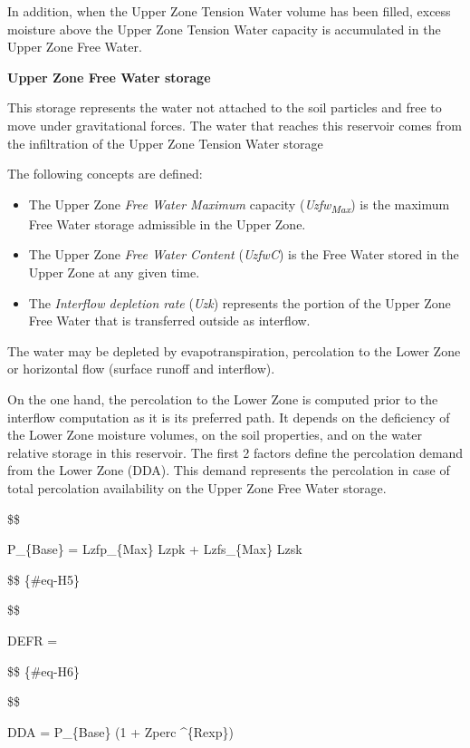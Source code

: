 \documentclass[
  letterpaper,
  DIV=11,
  numbers=noendperiod]{scrreprt}
\begin{document}
In addition, when the Upper Zone Tension Water volume has been filled,
excess moisture above the Upper Zone Tension Water capacity is
accumulated in the Upper Zone Free Water.

\textbf{Upper Zone Free Water storage}

This storage represents the water not attached to the soil particles and
free to move under gravitational forces. The water that reaches this
reservoir comes from the infiltration of the Upper Zone Tension Water
storage

The following concepts are defined:

\begin{itemize}
\item
  The Upper Zone \emph{Free Water Maximum} capacity
  (\emph{Uzfw\textsubscript{Max}}) is the maximum Free Water storage
  admissible in the Upper Zone.
\item
  The Upper Zone \emph{Free Water Content} (\emph{UzfwC}) is the Free
  Water stored in the Upper Zone at any given time.
\item
  The \emph{Interflow depletion rate} (\emph{Uzk}) represents the
  portion of the Upper Zone Free Water that is transferred outside as
  interflow.
\end{itemize}

The water may be depleted by evapotranspiration, percolation to the
Lower Zone or horizontal flow (surface runoff and interflow).

On the one hand, the percolation to the Lower Zone is computed prior to
the interflow computation as it is its preferred path. It depends on the
deficiency of the Lower Zone moisture volumes, on the soil properties,
and on the water relative storage in this reservoir. The first 2 factors
define the percolation demand from the Lower Zone (DDA). This demand
represents the percolation in case of total percolation availability on
the Upper Zone Free Water storage.

\$\$

P\_\{Base\} = Lzfp\_\{Max\} \cdot Lzpk + Lzfs\_\{Max\} \cdot Lzsk

\$\$ \{\#eq-H5\}

\$\$

DEFR =

\$\$ \{\#eq-H6\}

\$\$

DDA = P\_\{Base\} \cdot (1 + Zperc \^{}\{Rexp\})
\end{document}
